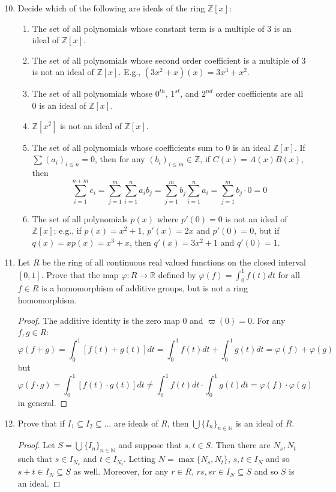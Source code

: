 \documentclass{report}
\newcommand{\N}{\mathbb{N}}
\newcommand{\Z}{\mathbb{Z}}
\newcommand{\R}{\mathbb{R}}
\begin{document}
\begin{enumerate}
    
    \setcounter{enumi}{9}
    \item Decide which of the following are ideals of the ring $\Z[x]$:
    \begin{enumerate}
        \item The set of all polynomials whose constant term is a multiple of $3$ is an ideal of $\Z[x]$.
        \item The set of all polynomials whose second order coefficient is a multiple of $3$ is not an ideal of $\Z[x]$. E.g., $(3x^2+x)(x)=3x^3+x^2$.
        \item The set of all polynomials whose $0^{th}$, $1^{st}$, and $2^{nd}$ order coefficients are all $0$ is an ideal of $\Z[x]$.
        \item $\Z[x^2]$ is not an ideal of $\Z[x]$.
        \item The set of all polynomials whose coefficients sum to $0$ is an ideal $\Z[x]$. If $\sum(a_i)_{i\leq n}=0$, then for any $(b_i)_{i\leq m}\in \Z$, if $C(x)=A(x)B(x)$, then
        $$\sum_{i=1}^{n+m}c_i = \sum_{j=1}^m\sum_{i=1}^n a_i b_j=\sum_{j=1}^m b_j \sum_{i=1}^n a_i=\sum_{j=1}^m b_j\cdot 0=0$$
        \item The set of all polynomials $p(x)$ where $p'(0)=0$ is not an ideal of $\Z[x]$; e.g., if $p(x)=x^2+1$, $p'(x)=2x$ and $p'(0)=0$, but if $q(x)=xp(x)=x^3+x$, then $q'(x)=3x^2+1$ and $q'(0)=1$.
    \end{enumerate}

    
    \item Let $R$ be the ring of all continuous real valued functions on the closed interval $[0,1]$. Prove that the map $\varphi:R\rightarrow\R$ defined by $\varphi(f)=\int_0^1f(t)dt$ for all $f\in R$ is a homomorphism of additive groups, but is not a ring homomorphism.
    \begin{proof}
        The additive identity is the zero map $0$ and $\varpi(0)=0$. For any $f,g\in R$:
        $$\varphi(f+g)=\int_0^1[f(t)+g(t)]dt=\int_0^1 f(t)dt + \int_0^1 g(t)dt = \varphi(f)+\varphi(g)$$
        but
        $$\varphi(f\cdot g)=\int_0^1[f(t)\cdot g(t)]dt\neq\int_0^1 f(t)dt \cdot \int_0^1 g(t)dt = \varphi(f)\cdot \varphi(g)$$
        in general.
    \end{proof}

    
    \setcounter{enumi}{18}
    \item Prove that if $I_1\subseteq I_2\subseteq ...$ are ideals of $R$, then $\bigcup\{I_n\}_{n\in\N}$ is an ideal of $R$.
    \begin{proof}
        Let $S=\bigcup\{I_n\}_{n\in\N}$ and suppose that $s,t\in S$. Then there are $N_s,N_t$ such that $s\in I_{N_s}$ and $t\in I_{N_t}$. Letting $N=\max\{N_s,N_t\}$, $s,t\in I_N$ and so $s+t\in I_N \subseteq S$ as well. Moreover, for any $r\in R$, $rs,sr\in I_N\subseteq S$ and so $S$ is an ideal.
    \end{proof}
\end{enumerate}
\end{document}
